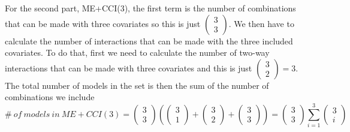 For the second part, ME+CCI(3), the first term is the number of combinations that can be made with three covariates so this is just $\left( \begin{array}{c}
3 \\ 
3 \end{array}
\right)$. We then have to calculate the number of interactions that can be made with the three included covariates. To do that, first we need to calculate the number of two-way interactions that can be made with three covariates and this is just $\left( \begin{array}{c}
3 \\ 
2 \end{array}
\right)=3$. The total number of models in the set is then the sum of the number of combinations we include
\[\#\ of\ models\ in\ ME+CCI(3)=\left( \begin{array}{c}
3 \\ 
3 \end{array}
\right)\left(\left( \begin{array}{c}
3 \\ 
1 \end{array}
\right)+\left( \begin{array}{c}
3 \\ 
2 \end{array}
\right)+\left( \begin{array}{c}
3 \\ 
3 \end{array}
\right)\right)=\left( \begin{array}{c}
3 \\ 
3 \end{array}
\right)\sum^3_{i=1}{\left( \begin{array}{c}
3 \\ 
i \end{array}
\right)}\] 

